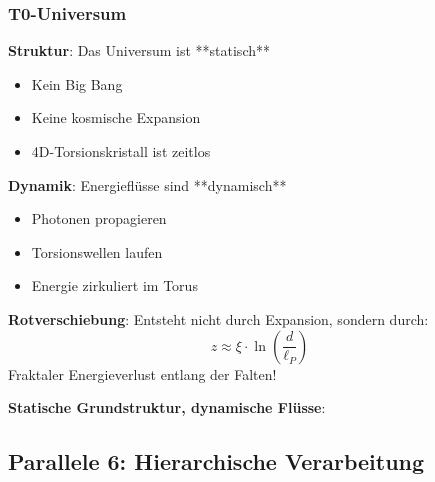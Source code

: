 	\subsubsection{T0-Universum}
	
	\textbf{Struktur}: Das Universum ist **statisch**
	\begin{itemize}
		\item Kein Big Bang
		\item Keine kosmische Expansion
		\item 4D-Torsionskristall ist zeitlos
	\end{itemize}
	
	\textbf{Dynamik}: Energieflüsse sind **dynamisch**
	\begin{itemize}
		\item Photonen propagieren
		\item Torsionswellen laufen
		\item Energie zirkuliert im Torus
	\end{itemize}
	
	\textbf{Rotverschiebung}: Entsteht nicht durch Expansion, sondern durch:
	\begin{equation}
		z \approx \xi \cdot \ln\left(\frac{d}{\ell_P}\right)
	\end{equation}
	Fraktaler Energieverlust entlang der Falten!
	
	\begin{keyresult}
		\textbf{Statische Grundstruktur, dynamische Flüsse}:
		
		\vspace{0.3cm}
		
		\begin{center}
		\end{center}
	\end{keyresult}
	
	\subsection{Parallele 6: Hierarchische Verarbeitung}
	
